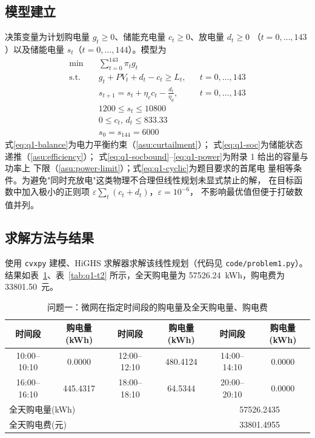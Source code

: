 \documentclass[withoutpreface,bwprint]{cumcmthesis}
\begin{document}
\subsection{模型建立}
决策变量为计划购电量 $g_t\ge0$、储能充电量 $c_t\ge0$、放电量 $d_t\ge0$
（$t=0,\dots,143$）以及储能电量 $s_t$（$t=0,\dots,144$）。模型为
\begin{align}
\min\quad & \sum_{t=0}^{143}\pi_t g_t \label{eq:q1-obj}\\
\text{s.t.}\quad
& g_t+PV_t+d_t-c_t\ge L_t, && t=0,\dots,143 \label{eq:q1-balance}\\
& s_{t+1}=s_t+\eta_c c_t-\frac{d_t}{\eta_d}, && t=0,\dots,143 \label{eq:q1-soc}\\
& 1200\le s_t\le10800 \label{eq:q1-socbound}\\
& 0\le c_t,\,d_t\le833.33 \label{eq:q1-power}\\
& s_0=s_{144}=6000 \label{eq:q1-cyclic}
\end{align}
式\eqref{eq:q1-balance}为电力平衡约束（\cref{asu:curtailment}）；
式\eqref{eq:q1-soc}为储能状态递推（\cref{asu:efficiency}）；
式\eqref{eq:q1-socbound}--\eqref{eq:q1-power}为附录 1 给出的容量与功率上
下限（\cref{asu:power-limit}）；式\eqref{eq:q1-cyclic}为题目要求的首尾电
量相等条件。为避免"同时充放电"这类物理不合理但线性规划未显式禁止的解，
在目标函数中加入极小的正则项 $\varepsilon\sum_t(c_t+d_t)$，$\varepsilon=10^{-6}$，
不影响最优值但便于打破数值并列。

\subsection{求解方法与结果}
使用 \texttt{cvxpy} 建模、HiGHS 求解器求解该线性规划（代码见
\texttt{code/problem1.py}）。结果如表~\ref{tab:q1-t1}、表~\ref{tab:q1-t2}
所示，全天购电量为 \num{57526.24}~kWh，购电费为 \num{33801.50}~元。

\begin{table}[!htbp]
\caption{问题一：微网在指定时间段的购电量及全天购电量、购电费}\label{tab:q1-t1}\centering
\begin{tabular}{cccccc}
\toprule[1.5pt]
时间段 & 购电量(kWh) & 时间段 & 购电量(kWh) & 时间段 & 购电量(kWh)\\
\midrule[1pt]
10:00--10:10 & 0.0000 & 12:00--12:10 & 480.4124 & 14:00--14:10 & 0.0000\\
16:00--16:10 & 445.4317 & 18:00--18:10 & 64.5344 & 20:00--20:10 & 0.0000\\
\midrule[1pt]
\multicolumn{4}{l}{全天购电量(kWh)} & \multicolumn{2}{c}{57526.2435}\\
\multicolumn{4}{l}{全天购电费(元)} & \multicolumn{2}{c}{33801.4955}\\
\bottomrule[1.5pt]
\end{tabular}
\end{table}
\end{document}
